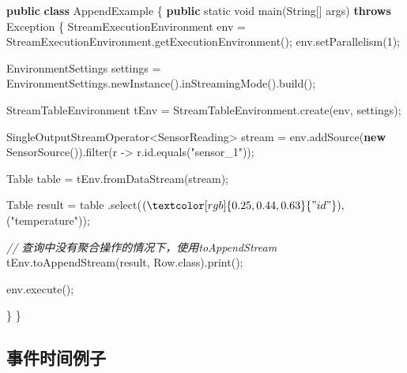 \documentclass[cn,11pt,chinese]{elegantbook}
\newenvironment{Shaded}{}{}
\newcommand{\BuiltInTok}[1]{#1}
\newcommand{\CommentTok}[1]{\textcolor[rgb]{0.38,0.63,0.69}{\textit{#1}}}
\newcommand{\DataTypeTok}[1]{\textcolor[rgb]{0.56,0.13,0.00}{#1}}
\newcommand{\DecValTok}[1]{\textcolor[rgb]{0.25,0.63,0.44}{#1}}
\newcommand{\FunctionTok}[1]{\textcolor[rgb]{0.02,0.16,0.49}{#1}}
\newcommand{\KeywordTok}[1]{\textcolor[rgb]{0.00,0.44,0.13}{\textbf{#1}}}
\newcommand{\NormalTok}[1]{#1}
\newcommand{\StringTok}[1]{\textcolor[rgb]{0.25,0.44,0.63}{#1}}
\begin{document}
\begin{Shaded}
\begin{Highlighting}[]
\KeywordTok{public} \KeywordTok{class}\NormalTok{ AppendExample \{}
    \KeywordTok{public} \DataTypeTok{static} \DataTypeTok{void} \FunctionTok{main}\NormalTok{(}\BuiltInTok{String}\NormalTok{[] args) }\KeywordTok{throws} \BuiltInTok{Exception}\NormalTok{ \{}
\NormalTok{        StreamExecutionEnvironment env = StreamExecutionEnvironment.}\FunctionTok{getExecutionEnvironment}\NormalTok{();}
\NormalTok{        env.}\FunctionTok{setParallelism}\NormalTok{(}\DecValTok{1}\NormalTok{);}

\NormalTok{        EnvironmentSettings settings = EnvironmentSettings.}\FunctionTok{newInstance}\NormalTok{().}\FunctionTok{inStreamingMode}\NormalTok{().}\FunctionTok{build}\NormalTok{();}

\NormalTok{        StreamTableEnvironment tEnv = StreamTableEnvironment.}\FunctionTok{create}\NormalTok{(env, settings);}

\NormalTok{        SingleOutputStreamOperator\textless{}SensorReading\textgreater{} stream = env.}\FunctionTok{addSource}\NormalTok{(}\KeywordTok{new} \FunctionTok{SensorSource}\NormalTok{()).}\FunctionTok{filter}\NormalTok{(r {-}\textgreater{} r.}\FunctionTok{id}\NormalTok{.}\FunctionTok{equals}\NormalTok{(}\StringTok{"sensor\_1"}\NormalTok{));}

\NormalTok{        Table table = tEnv.}\FunctionTok{fromDataStream}\NormalTok{(stream);}

\NormalTok{        Table result = table}
\NormalTok{                .}\FunctionTok{select}\NormalTok{($(}\StringTok{"id"}\NormalTok{), $(}\StringTok{"temperature"}\NormalTok{));}

        \CommentTok{// 查询中没有聚合操作的情况下，使用toAppendStream}
\NormalTok{        tEnv.}\FunctionTok{toAppendStream}\NormalTok{(result, Row.}\FunctionTok{class}\NormalTok{).}\FunctionTok{print}\NormalTok{();}

\NormalTok{        env.}\FunctionTok{execute}\NormalTok{();}

\NormalTok{    \}}
\NormalTok{\}}
\end{Highlighting}
\end{Shaded}

\hypertarget{ux4e8bux4ef6ux65f6ux95f4ux4f8bux5b50}{%
\subsection{事件时间例子}\label{ux4e8bux4ef6ux65f6ux95f4ux4f8bux5b50}}
\end{document}
